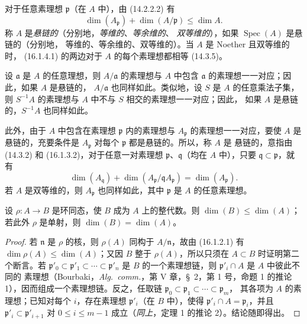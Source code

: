 \begin{env}[16.1.4]
\label{0.16.1.4-fr}
对于任意素理想 $\mathfrak{p}$（在 $A$ 中），由 (14.2.2.2) 有
\[
\label{0.16.1.4.1-fr}
  \dim(A_{\mathfrak{p}})+\dim(A/\mathfrak{p})\leq\dim A.
\tag{16.1.4.1}
\]
称 $A$ 是\emph{悬链的}（分别地，\emph{等维的}、\emph{等余维的}、
\emph{双等维的}），如果 $\operatorname{Spec}(A)$ 是悬链的（分别地，
等维的、等余维的、双等维的）。当 $A$ 是 Noether 且双等维的时，
(16.1.4.1) 的两边对于 $A$ 的每个素理想都相等 (14.3.5)。

设 $\mathfrak{a}$ 是 $A$ 的任意理想，则 $A/\mathfrak{a}$ 的素理想与 $A$
中包含 $\mathfrak{a}$ 的素理想一一对应；因此，如果 $A$ 是悬链的，
$A/\mathfrak{a}$ 也同样如此。类似地，设 $S$ 是 $A$ 的任意乘法子集，
则 $S^{-1}A$ 的素理想与 $A$ 中不与 $S$ 相交的素理想一一对应；因此，
如果 $A$ 是悬链的，$S^{-1}A$ 也同样如此。

此外，由于 $A$ 中包含在素理想 $\mathfrak{p}$ 内的素理想与
$A_{\mathfrak{p}}$ 的素理想一一对应，要使 $A$ 是悬链的，充要条件是
$A_{\mathfrak{p}}$ 对每个 $\mathfrak{p}$ 都是悬链的。所以，称 $A$ 是
悬链的，意指由 (14.3.2) 和 (16.1.3.2)，对于任意一对素理想
$\mathfrak{p}$、$\mathfrak{q}$（均在 $A$ 中），只要
$\mathfrak{q}\subset\mathfrak{p}$，就有
\[
\label{0.16.1.4.2-fr}
  \dim(A_{\mathfrak{q}})
  +\dim(A_{\mathfrak{p}}/\mathfrak{q}A_{\mathfrak{p}})
  =\dim(A_{\mathfrak{p}}).
\tag{16.1.4.2}
\]
若 $A$ 是双等维的，则 $A_{\mathfrak{p}}$ 也同样如此，其中
$\mathfrak{p}$ 是 $A$ 的任意素理想。
\end{env}

\begin{proposition}[16.1.5]
\label{0.16.1.5-fr}
设 $\rho:A\to B$ 是环同态，使 $B$ 成为 $A$ 上的整代数。则
$\dim(B)\leq\dim(A)$；若此外 $\rho$ 是单射，则
$\dim(B)=\dim(A)$。
\end{proposition}

\begin{proof}
若 $\mathfrak{n}$ 是 $\rho$ 的核，则 $\rho(A)$ 同构于
$A/\mathfrak{n}$，故由 (16.1.2.1) 有
$\dim\rho(A)\leq\dim(A)$；又因 $B$ 整于 $\rho(A)$，所以只须在
$A\subset B$ 时证明第二个断言。若
$\mathfrak{p}'_0\subset\mathfrak{p}'_1\subset\cdots\subset\mathfrak{p}'_n$
是 $B$ 的一个素理想链，则 $\mathfrak{p}'_i\cap A$ 是 $A$ 中彼此不同的
素理想（Bourbaki，\emph{Alg.~comm.}，第 V 章，\S~2，第 1 号，命题 1
的推论 1），因而组成一个素理想链。反之，任取链
$\mathfrak{p}_0\subset\mathfrak{p}_1\subset\cdots\subset\mathfrak{p}_m$，
其各项为 $A$ 的素理想；已知对每个 $i$，存在素理想
$\mathfrak{p}'_i$（在 $B$ 中），使得 $\mathfrak{p}'_i\cap A=\mathfrak{p}_i$，并且
$\mathfrak{p}'_i\subset\mathfrak{p}'_{i+1}$ 对
$0\leq i\leq m-1$ 成立（\emph{同上}，定理 1 的推论 2）。结论随即得出。
\end{proof}

